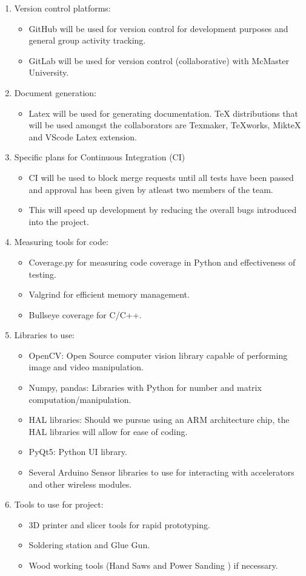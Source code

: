 \documentclass[12pt]{article}
\begin{document}
\begin{enumerate}
\item Version control platforms:
\begin{itemize}
\item GitHub will be used for version control for development purposes and general group activity tracking.
\item GitLab will be used for version control (collaborative) with McMaster University.
\end{itemize}
\item Document generation:
\begin{itemize}
\item Latex will be used for generating documentation. TeX distributions that will be used amongst the collaborators are  Texmaker, TeXworks, MikteX and VScode Latex extension.
\end{itemize}
\item Specific plans for Continuous Integration (CI)
\begin{itemize}
\item CI will be used to block merge requests until all tests have been passed and approval has been given by atleast two members of the team. 
\item This will speed up development by reducing the overall bugs introduced into the project.
\end{itemize}
\item Measuring tools for code:
\begin{itemize}
\item Coverage.py for measuring code coverage in Python and effectiveness of testing.
\item Valgrind for efficient memory management.
\item Bullseye coverage for C/C++.
\end{itemize}
\item Libraries to use:
\begin{itemize}
\item OpenCV: Open Source computer vision library capable of performing image and video manipulation.
\item Numpy, pandas: Libraries with Python for number and matrix computation/manipulation.
\item HAL libraries: Should we pursue using an ARM architecture chip, the HAL libraries will allow for ease of coding.
\item PyQt5: Python UI library.
\item Several Arduino Sensor libraries to use for interacting with accelerators and other wireless modules.
\end{itemize}
\item Tools to use for project:
\begin{itemize}
\item 3D printer and slicer tools for rapid prototyping.
\item Soldering station and Glue Gun.
\item Wood working tools (Hand Saws and Power Sanding ) if necessary.
\end{itemize}
\end{enumerate}
\newpage
\end{document}
